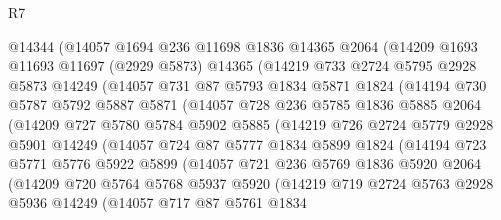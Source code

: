 \begin{lexlean}{R7}
\begin{coremodule}
        @14344
        (@14057
          @1694
          @236
          @11698
          @1836
          @14365
          @2064
          (@14209
            @1693
            @11693
            @11697
            (@2929 @5873)
            @14365
            (@14219
              @733
              @2724
              @5795
              @2928
              @5873
              @14249
              (@14057
                @731
                @87
                @5793
                @1834
                @5871
                @1824
                (@14194
                  @730
                  @5787
                  @5792
                  @5887
                  @5871
                  (@14057
                    @728
                    @236
                    @5785
                    @1836
                    @5885
                    @2064
                    (@14209
                      @727
                      @5780
                      @5784
                      @5902
                      @5885
                      (@14219
                        @726
                        @2724
                        @5779
                        @2928
                        @5901
                        @14249
                        (@14057
                          @724
                          @87
                          @5777
                          @1834
                          @5899
                          @1824
                          (@14194
                            @723
                            @5771
                            @5776
                            @5922
                            @5899
                            (@14057
                              @721
                              @236
                              @5769
                              @1836
                              @5920
                              @2064
                              (@14209
                                @720
                                @5764
                                @5768
                                @5937
                                @5920
                                (@14219
                                  @719
                                  @2724
                                  @5763
                                  @2928
                                  @5936
                                  @14249
                                  (@14057
                                    @717
                                    @87
                                    @5761
                                    @1834

\end{coremodule}
\end{lexlean}
